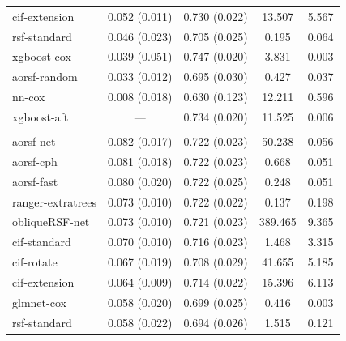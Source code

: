 \documentclass[twoside,11pt]{article}\usepackage[]{graphicx}\usepackage[]{xcolor}
\newenvironment{knitrout}{}{} %
\begin{document}
\begin{knitrout}
\begin{longtable}[t]{lcccc}
\hspace{1em}cif-extension & 0.052 (0.011) & 0.730 (0.022) & 13.507 & 5.567\\
\hspace{1em}rsf-standard & 0.046 (0.023) & 0.705 (0.025) & 0.195 & 0.064\\
\hspace{1em}xgboost-cox & 0.039 (0.051) & 0.747 (0.020) & 3.831 & 0.003\\
\hspace{1em}aorsf-random & 0.033 (0.012) & 0.695 (0.030) & 0.427 & 0.037\\
\hspace{1em}nn-cox & 0.008 (0.018) & 0.630 (0.123) & 12.211 & 0.596\\
\hspace{1em}xgboost-aft & --- & 0.734 (0.020) & 11.525 & 0.006\\
\addlinespace[0.3em]
\multicolumn{5}{l}{\textit{\textbf{GUIDE-IT; HF hospitalization, n = 894, p = 59}}}\\
\hline
\hspace{1em}aorsf-net & 0.082 (0.017) & 0.722 (0.023) & 50.238 & 0.056\\
\hspace{1em}aorsf-cph & 0.081 (0.018) & 0.722 (0.023) & 0.668 & 0.051\\
\hspace{1em}aorsf-fast & 0.080 (0.020) & 0.722 (0.025) & 0.248 & 0.051\\
\hspace{1em}ranger-extratrees & 0.073 (0.010) & 0.722 (0.022) & 0.137 & 0.198\\
\hspace{1em}obliqueRSF-net & 0.073 (0.010) & 0.721 (0.023) & 389.465 & 9.365\\
\hspace{1em}cif-standard & 0.070 (0.010) & 0.716 (0.023) & 1.468 & 3.315\\
\hspace{1em}cif-rotate & 0.067 (0.019) & 0.708 (0.029) & 41.655 & 5.185\\
\hspace{1em}cif-extension & 0.064 (0.009) & 0.714 (0.022) & 15.396 & 6.113\\
\hspace{1em}glmnet-cox & 0.058 (0.020) & 0.699 (0.025) & 0.416 & 0.003\\
\hspace{1em}rsf-standard & 0.058 (0.022) & 0.694 (0.026) & 1.515 & 0.121\\

\end{longtable}
\end{knitrout}
\end{document}
